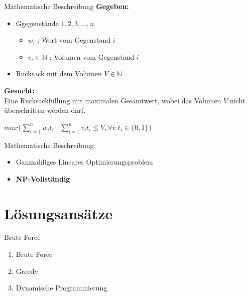 \documentclass[10pt]{beamer}
\begin{document}
\begin{frame}[fragile]{Mathematische Beschreibung}
	\textbf{Gegeben:}
	\begin{itemize}
		\item Ggegenstände $1, 2, 3 , ..., n$
			\begin{itemize}
				\item $w_{i}$ : Wert vom Gegenstand $i$
				\item $v_{i} \in \mathbb{N}$ : Volumen vom Gegenstand $i$
			\end{itemize}
		\item Rucksack mit dem Volumen $V \in \mathbb{N}$
	\end{itemize}
	
	\textbf{Gesucht:}\\ 
	\vspace{0.3cm}
	\hspace{0.3cm}
	Eine Rucksackfüllung mit maximalen Gesamtwert, wobei das Volumen $V$ nicht überschritten werden darf.\\
	\vspace{0.3cm}
	\begin{center}
		$max \Big\lbrace \sum \limits_{i=1}^{n} w_{i}t_{i} \mid \sum \limits_{i=1}^{n} v_{i}t_{i} \leq V , \forall i : t_{i} \in \{0, 1\} \Big\rbrace$
	\end{center}
\end{frame}

\begin{frame}[fragile]{Mathematische Beschreibung}
	\begin{itemize}[<+- | alert@+>]
		\item[] \begin{center}
			Ganzzahliges Lineares Optimierungsproblem
		\end{center}
		\item[] \begin{center}
			\textbf{NP-Vollständig}
		\end{center}
	\end{itemize}
\end{frame}

\section{Lösungsansätze}

\begin{frame}[fragile]{Brute Force}
	\begin{enumerate}
		\item Brute Force
		\item Greedy
		\item Dynamische Programmierung 
	\end{enumerate}
\end{frame}
\end{document}
